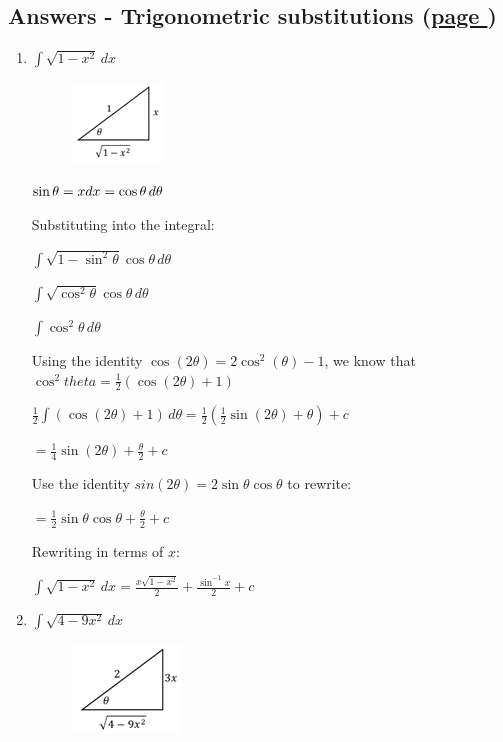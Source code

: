 \documentclass[../main.tex]{subfiles}
\begin{document}
\hypertarget{trigsubsanswers}{\subsection*{Answers - Trigonometric substitutions (\hyperlink{trigsubslink}{page \pageref{Trig substitution}})}}

\label{Trig subs answers}
\begin{enumerate}
    \item 
    \(\int \sqrt{1-x^2}\,dx\)
    \begin{figure}[h]
        \includegraphics{images/trigsuba1.png}
    \end{figure}

    \(\sin{\theta}=x\\
    dx=\cos{\theta}\, d\theta\)
    
    Substituting into the integral:

    \(\int \sqrt{1-\sin^2{\theta}}\cos{\theta}\,d\theta\)

    \(\int \sqrt{\cos^2{\theta}}\cos{\theta}\,d\theta\)

    \(\int \cos^2{\theta} \,d\theta\)

    Using the identity \(\cos{(2\theta)}=2\cos^2{(\theta)}-1\), we know that \(\cos^2{theta}=\frac{1}{2}(\cos{(2\theta)}+1)\)

    \(\frac{1}{2}\int (\cos{(2\theta)}+1)\,d\theta=\frac{1}{2}(\frac{1}{2}\sin{(2\theta)}+\theta)+c\)

    \(=\frac{1}{4}\sin{(2\theta)}+\frac{\theta}{2}+c\)

    Use the identity \(sin{(2\theta)}=2\sin{\theta}\cos{\theta}\) to rewrite:

    \(=\frac{1}{2}\sin{\theta}\cos{\theta}+\frac{\theta}{2}+c\)

    Rewriting in terms of \(x\):

    \(\int \sqrt{1-x^2}\,dx=\frac{x\sqrt{1-x^2}}{2}+\frac{\sin^{-1}{x}}{2}+c\)

    \item 
    \(\int \sqrt{4-9x^2}\,dx\)
    \begin{figure}[h]
        \includegraphics{images/trigsuba2.png}
    \end{figure}


\end{enumerate}
\end{document}
